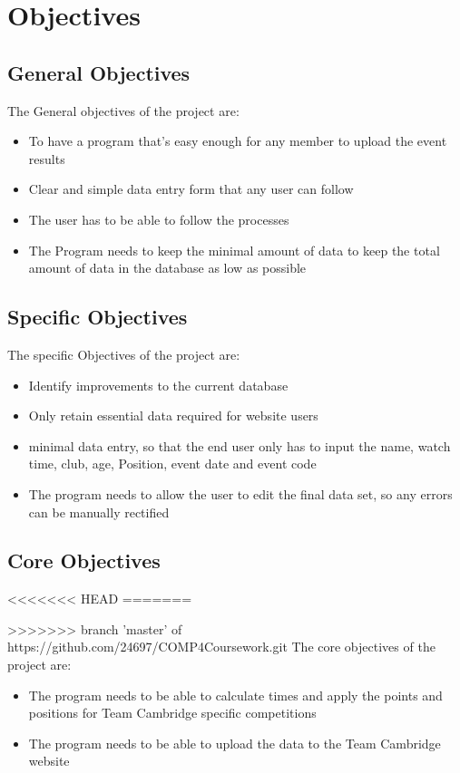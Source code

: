 \section{Objectives}

\subsection{General Objectives}
The General objectives of the project are:
\begin{itemize}
	\item To have a program that's easy enough for any member to upload the event results
	\item Clear and simple data entry form that any user can follow
	\item The user has to be able to follow the processes
	\item The Program needs to keep the minimal amount of data to keep the total amount of data in the database as low as possible
\end{itemize}

\subsection{Specific Objectives}
The specific Objectives of the project are:
\begin{itemize}
	\item Identify improvements to the current database
	\item Only retain essential data required for website users
	\item minimal data entry, so that the end user only has to input the name, watch time, club, age, Position, event date and event code
	\item The program needs to allow the user to edit the final data set, so any errors can be manually rectified
\end{itemize}

\subsection{Core Objectives}
<<<<<<< HEAD
=======

>>>>>>> branch 'master' of https://github.com/24697/COMP4Coursework.git
The core objectives of the project are:
\begin{itemize}
	\item The program needs to be able to calculate times and apply the points and positions for Team Cambridge specific competitions
	\item The program needs to be able to upload the data to the Team Cambridge website
\end{itemize}
